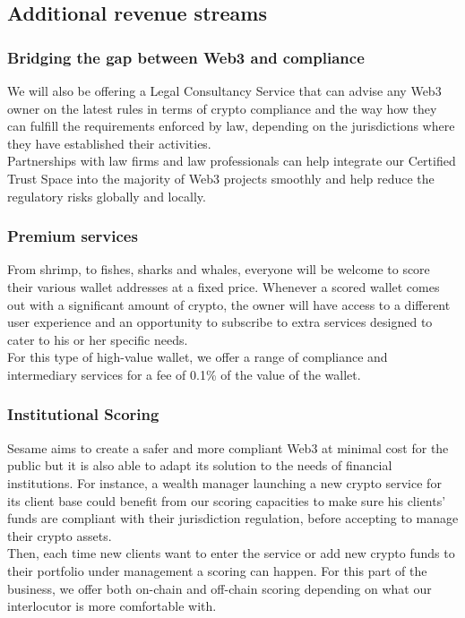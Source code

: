 ﻿\documentclass[a4paper]{article}
\let\OldTexttrademark\texttrademark
\renewcommand{\texttrademark}{\OldTexttrademark\xspace}%
\begin{document}
\subsection{Additional revenue streams}
\subsubsection{Bridging the gap between Web3 and compliance}
We will also be offering a Legal Consultancy Service that can advise any Web3 owner on the latest rules in terms of crypto compliance and the way how they can fulfill the requirements enforced by law, depending on the jurisdictions where they have established their activities. \\

Partnerships with law firms and law professionals can help integrate our Certified Trust Space\texttrademark into the majority of Web3 projects smoothly and help reduce the regulatory risks globally and locally.

\subsubsection{Premium services}
From shrimp, to fishes, sharks and whales, everyone will be welcome to score their various wallet addresses at a fixed price. Whenever a scored wallet comes out with a significant amount of crypto, the owner will have access to a different user experience and an opportunity to subscribe to extra services designed to cater to his or her specific needs. \\

For this type of high-value wallet, we offer a range of compliance and intermediary services for a fee of 0.1\% of the value of the wallet.
\subsubsection{Institutional Scoring} 
Sesame aims to create a safer and more compliant Web3 at minimal cost for the public but it is also able to adapt its solution to the needs of financial institutions. 
For instance, a wealth manager launching a new crypto service for its client base could benefit from our scoring capacities to make sure his clients’ funds are compliant with their jurisdiction regulation, before accepting to manage their crypto assets. \\

Then, each time new clients want to enter the service or add new crypto funds to their portfolio under management a scoring can happen. For this part of the business, we offer both on-chain and off-chain scoring depending on what our interlocutor is more comfortable with. 
\end{document}

